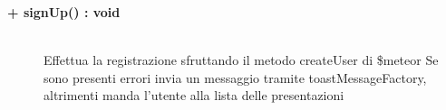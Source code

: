 \begin{description}
	\begin{description}
		\item[\textbf{\color{blue}+ signUp() : void			}] \hfill \\
			Effettua la registrazione sfruttando il metodo createUser di \$meteor
			Se sono presenti errori invia un messaggio tramite toastMessageFactory, altrimenti manda l'utente alla lista delle presentazioni
	\end{description}

\end{description}
















